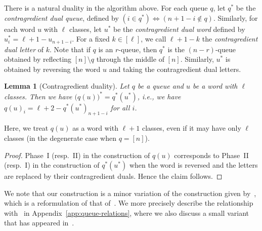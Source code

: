 \documentclass[reqno]{amsart}
\newcommand{\0}{\phantom{c}}
\DeclareMathOperator{\inter}{int} %
\newcommand{\tup}[1]{\left( #1 \right)}
\newcommand{\ive}[1]{\left[ #1 \right]}
\newcommand{\defn}[1]{{\color{darkred}\emph{#1}}} %
\theoremstyle{plain}
\newtheorem{lemma}[thm]{Lemma}
\theoremstyle{definition}
\newtheorem{remark}[thm]{Remark}
\numberwithin{equation}{section}
\begin{document}
There is a natural duality in the algorithm above.
For each queue $q$, let $q^*$ be the \defn{contragredient dual queue}, defined by $\tup{i \in q^*} \Longleftrightarrow \tup{n+1-i \notin q}$.
Similarly, for each word $u$ with $\ell$ classes, let $u^*$ be the \defn{contragredient dual word} defined by $u^*_i = \ell + 1 - u_{n+1-i}$.
For a fixed $k \in \ive{\ell}$, we call $\ell + 1 - k$ the \defn{contragredient dual letter} of $k$.
Note that if $q$ is an $r$-queue, then $q^*$ is the $(n-r)$-queue obtained by reflecting $[n] \setminus q$ through the middle of $[n]$.
Similarly, $u^*$ is obtained by reversing the word $u$ and taking the contragredient dual letters.

\begin{lemma}[Contragredient duality]
  \label{le:dual}
  Let $q$ be a queue and $u$ be a word with $\ell$ classes.
  Then we have $\bigl(q(u) \bigr)^* = q^*(u^*)$, \textit{i.e.}, we have $q(u)_i = \ell + 2 - q^*(u^*)_{n+1-i}$ for all $i$.
\end{lemma}

Here, we treat $q(u)$ as a word with $\ell+1$ classes, even if it may have only $\ell$ classes (in the degenerate case when $q = \ive{n}$).

\begin{proof}
Phase~I (resp.~II) in the construction of $q(u)$ corresponds to Phase~II (resp.~I) in the construction of $q^*(u^*)$ when the word is reversed and the letters are replaced by their contragredient duals.
Hence the claim follows.
\end{proof}


We note that our construction is a minor variation of the construction given by~\cite[\S 3.1]{AAMP11}, which is a reformulation of that of~\cite{FM07}.
We more precisely describe the relationship with~\cite{FM07} in Appendix~\ref{app:queue-relations}, where we also discuss a small variant that has appeared in~\cite{AssSea18}.
\end{document}

